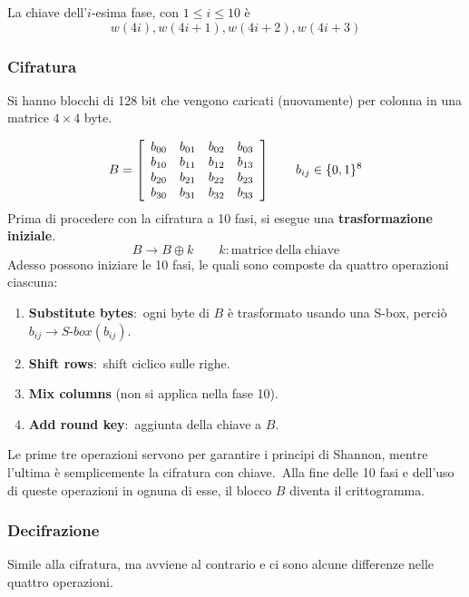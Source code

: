 La chiave dell'$i$-esima fase, con $1 \leq i \leq 10$ è \[w(4i), w(4i+1), w(4i+2), w(4i+3)\]

\subsubsection{Cifratura}

Si hanno blocchi di 128 bit che vengono caricati (nuovamente) per colonna in una matrice $4 \times 4$ byte.\

\[B = \left[\begin{array}{c c c c}
            b_{00} & b_{01} & b_{02} & b_{03} \\
            b_{10} & b_{11} & b_{12} & b_{13} \\
            b_{20} & b_{21} & b_{22} & b_{23} \\
            b_{30} & b_{31} & b_{32} & b_{33} \\
        \end{array}\right] \qquad b_{ij} \in \{0,1\}^8\]
Prima di procedere con la cifratura a 10 fasi, si esegue una \textbf{trasformazione iniziale}.\
\[B \rightarrow B \oplus k\qquad k: \mathrm{matrice\ della\ chiave}\]
Adesso possono iniziare le 10 fasi, le quali sono composte da quattro operazioni ciascuna:

\begin{enumerate}
    \item \textbf{Substitute bytes}:\ ogni byte di $B$ è trasformato usando una S-box, perciò $b_{ij} \rightarrow S\textrm{-}box(b_{ij})$.
    \item \textbf{Shift rows}:\ shift ciclico sulle righe.
    \item \textbf{Mix columns} (non si applica nella fase 10).
    \item \textbf{Add round key}:\ aggiunta della chiave a $B$.
\end{enumerate}

\noindent Le prime tre operazioni servono per garantire i principi di Shannon, mentre l'ultima è semplicemente la cifratura con chiave.\
Alla fine delle 10 fasi e dell'uso di queste operazioni in ognuna di esse, il blocco $B$ diventa il crittogramma.\

\subsubsection{Decifrazione}

Simile alla cifratura, ma avviene al contrario e ci sono alcune differenze nelle quattro operazioni.

